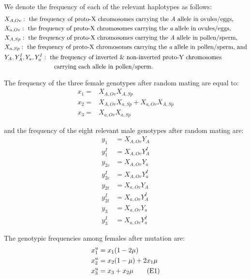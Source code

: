 \documentclass{article}
\newcommand\numberthis{\addtocounter{equation}{1}\tag{\theequation}}
\begin{document}
\begin{appendices}
We denote the frequency of each of the relevant haplotypes as follows: 
\begin{align*}
	&X_{A,Ov}:~\text{the frequency of proto-X chromosomes carrying the {\itshape A} allele in ovules/eggs,}\\ 
	&X_{a,Ov}:~\text{the frequency of proto-X chromosomes carrying the {\itshape a} allele in ovules/eggs,}\\ 
	&X_{A,Sp}:~\text{the frequency of proto-X chromosomes carrying the {\itshape A} allele in pollen/sperm,}\\ 
	&X_{a,Sp}:~\text{the frequency of proto-X chromosomes carrying the {\itshape a} allele in pollen/sperm, and}\\ 
	&Y_A, Y_A^{I}, Y_a, Y_a^{I}:~\text{the frequency of inverted \& non-inverted proto-Y chromosomes}\\ &~~~~~~~~~~~~~~~~~~~~~~~~\text{carrying each allele in pollen/sperm.}
\end{align*}

\noindent The frequency of the three female genotypes after random mating are equal to:
\begin{align*}
		x_1 = & X_{A,Ov}  X_{A,Sp} \\
		x_2 = & X_{A,Ov}  X_{a,Sp} + X_{a,Ov} X_{A,Sp} \\
		x_3 = & X_{a,Ov}  X_{a,Sp} 
\end{align*}

\noindent and the frequency of the eight relevant male genotypes after random mating are:
\begin{align*}
		y_1      &= X_{A,Ov} Y_A \\
		y^I_1    &= X_{A,Ov} Y^I_A \\
		y_{2c}   &= X_{A,Ov} Y_a \\
		y^I_{2c} &= X_{A,Ov} Y^I_a \\
		y_{2t}   &= X_{a,Ov} Y_A \\
		y^I_{2t} &= X_{a,Ov} Y^I_A \\
		y_{3}    &= X_{a,Ov} Y_a \\
		y^I_{3}  &= X_{a,Ov} Y^I_a 
\end{align*}

\noindent The genotypic frequencies among females after mutation are:
\begin{align*}
	x^u_{1} &= x_1 (1 - 2 \mu) \\
	x^u_{2} &= x_2 (1 - \mu) + 2 x_1 \mu \\
	x^u_{3} &= x_3 + x_2 \mu \numberthis
\end{align*}


\end{appendices}
\end{document}
